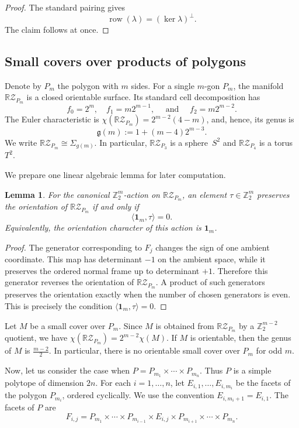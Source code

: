 \documentclass{amsart}
\newtheorem{lemma}[theorem]{Lemma}
\numberwithin{equation}{section}
\theoremstyle{definition}
\theoremstyle{remark}
\newcommand{\Z}{\mathbb Z}
\newcommand{\RZ}{\mathbb R\mathcal Z}
\newcommand{\one}{\mathbf 1}
\newcommand{\genus}{\mathfrak g}
\DeclareMathOperator{\row}{row}
\begin{document}
\begin{proof}
The standard pairing gives
$$
    \row(\lambda)=(\ker\lambda)^\perp.
$$
The claim follows at once.
\end{proof}


\subsection{Small covers over products of polygons}

Denote by $P_m$ the polygon with $m$ sides.
For a single $m$-gon $P_m$, the manifold $\RZ_{P_m}$ is a closed orientable surface.
Its standard cell decomposition has
$$
    f_0=2^m, \quad f_1=m2^{m-1},\quad \text{ and } \quad f_2=m2^{m-2}.
$$
The Euler characteristic is $\chi(\RZ_{P_m})=2^{m-2}(4-m)$, and, hence, its genus is
$$
    \genus(m):=1+(m-4)2^{m-3}.
$$
We write $\RZ_{P_m}\cong \Sigma_{g(m)}$.
In particular, $\RZ_{P_3}$ is a sphere~$S^2$ and $\RZ_{P_4}$ is a torus~$T^2$.

We prepare one linear algebraic lemma for later computation.
\begin{lemma}\label{lem:orientation-character-polygon}
    For the canonical $\Z_2^m$-action on $\RZ_{P_m}$, an element $\tau\in\Z_2^m$ preserves the orientation of $\RZ_{P_m}$ if and only if 
    $$
        \langle \one_m,\tau\rangle=0.
    $$
    Equivalently, the orientation character of this action is $\one_m$.
\end{lemma}

\begin{proof}
    The generator corresponding to $F_j$ changes the sign of one ambient coordinate.
    This map has determinant $-1$ on the ambient space, while it preserves the ordered normal frame up to determinant $+1$.
    Therefore this generator reverses the orientation of $\RZ_{P_m}$. 
    A product of such generators preserves the orientation exactly when the number of chosen generators is even.
    This is precisely the condition $\langle \one_m,\tau\rangle=0$.
\end{proof}

Let $M$ be a small cover over $P_m$.
Since $M$ is obtained from $\RZ_{P_m}$ by a $\Z_2^{m-2}$ quotient, we have $\chi(\RZ_{P_m}) = 2^{m-2} \chi(M)$.
If $M$ is orientable, then the genus of $M$ is $\frac{m-2}{2}$.
In particular, there is no orientable small cover over $P_m$ for odd $m$.


Now, let us consider the case when $P=P_{m_1}\times\cdots\times P_{m_n}$.
Thus $P$ is a simple polytope of dimension $2n$.
For each $i=1,\ldots,n$, let $E_{i,1},\ldots,E_{i,m_i}$ be the facets of the polygon $P_{m_i}$, ordered cyclically.
We use the convention $E_{i,m_i+1}=E_{i,1}$.
The facets of $P$ are
\begin{equation}\label{eq:facets_index}
    F_{i,j} = P_{m_1}\times\cdots\times P_{m_{i-1}} \times E_{i,j} \times P_{m_{i+1}}\times\cdots\times P_{m_n}.
\end{equation}
\end{document}
